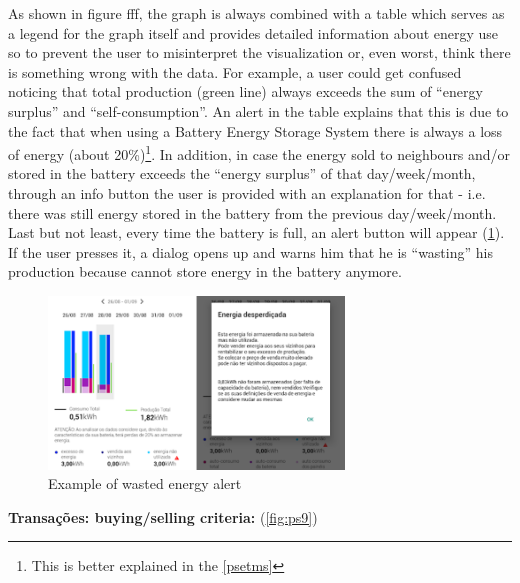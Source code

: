 As shown in figure fff, the graph is always combined with a table which serves as a legend for the graph itself and provides detailed information about energy use so to prevent the user to misinterpret the visualization or, even worst, think there is something wrong with the data. For example, a user could get confused noticing that total production (green line) always exceeds the sum of “energy surplus” and “self-consumption”. An alert in the table explains that this is due to the fact that when using a Battery Energy Storage System there is always a loss of energy (about 20\%)\footnote{This is better explained in the \ref{psetms}}. In addition, in case the energy sold to neighbours and/or stored in the battery exceeds the “energy surplus” of that day/week/month, through an info button the user is provided with an explanation for that - i.e. there was still energy stored in the battery from the previous day/week/month.
Last but not least, every time the battery is full, an alert button will appear (\cref{fig:ps8}). If the user presses it, a dialog opens up and warns him that he is “wasting” his production because cannot store energy in the battery anymore.


\begin{figure}[h]
\centering
\includegraphics[width=0.7\textwidth]{./Images/ps8}
\caption{Example of wasted energy alert}
\label{fig:ps8}
\end{figure}


\textbf{ Transações: buying/selling criteria:} (\cref{fig:ps9})


